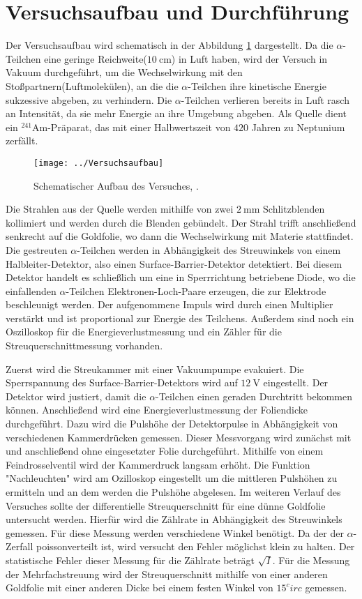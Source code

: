 \section{Versuchsaufbau und Durchführung}
\label{sec:Durchführung}
Der Versuchsaufbau wird schematisch in der Abbildung \ref{fig:versuchsaufbau} dargestellt. Da die $\alpha$-Teilchen eine geringe Reichweite($\SI{10}{\centi\meter}$) in Luft haben, wird der Versuch in Vakuum durchgeführt, um die Wechselwirkung mit den Stoßpartnern(Luftmolekülen), an die die $\alpha$-Teilchen ihre kinetische Energie sukzessive abgeben, zu verhindern. Die $\alpha$-Teilchen verlieren bereits in Luft rasch an Intensität, da sie mehr Energie an ihre Umgebung abgeben. Als Quelle dient ein $^{241}$Am-Präparat, das mit einer Halbwertszeit von $420$ Jahren zu Neptunium zerfällt.
\begin{figure}[h!]
	\centering
	\texttt{[image: ../Versuchsaufbau]}
	\caption{Schematischer Aufbau des Versuches, \cite[2]{anleitungV16}.}
	\label{fig:versuchsaufbau}
\end{figure}
Die Strahlen aus der Quelle werden mithilfe von zwei $\SI{2}{\milli\meter}$ Schlitzblenden kollimiert und werden durch die Blenden gebündelt. Der Strahl trifft anschließend senkrecht auf die Goldfolie, wo dann die Wechselwirkung mit Materie stattfindet. Die gestreuten $\alpha$-Teilchen werden in Abhängigkeit des Streuwinkels von einem Halbleiter-Detektor, also einen Surface-Barrier-Detektor detektiert. Bei diesem Detektor handelt es schließlich um eine in Sperrrichtung betriebene Diode, wo die einfallenden $\alpha$-Teilchen Elektronen-Loch-Paare erzeugen, die zur Elektrode beschleunigt werden. Der aufgenommene Impuls wird durch einen Multiplier verstärkt und ist proportional zur Energie des Teilchens. Außerdem sind noch ein Oszilloskop für die Energieverlustmessung und ein Zähler für die Streuquerschnittmessung vorhanden.

Zuerst wird die Streukammer mit einer Vakuumpumpe evakuiert. Die Sperrspannung des Surface-Barrier-Detektors wird auf $\SI{12}{\volt}$ eingestellt. Der Detektor wird justiert, damit die $\alpha$-Teilchen einen geraden Durchtritt bekommen können. Anschließend wird eine Energieverlustmessung der Foliendicke durchgeführt. Dazu wird die Pulshöhe der Detektorpulse in Abhängigkeit von verschiedenen Kammerdrücken gemessen. Dieser Messvorgang wird zunächst mit und anschließend ohne eingesetzter Folie durchgeführt. Mithilfe von einem Feindrosselventil wird der Kammerdruck langsam erhöht. Die Funktion "Nachleuchten" wird am Ozilloskop eingestellt um die mittleren Pulshöhen zu ermitteln und an dem werden die Pulshöhe abgelesen. Im weiteren Verlauf des Versuches sollte der differentielle Streuquerschnitt für eine dünne Goldfolie untersucht werden. Hierfür wird die Zählrate in Abhängigkeit des Streuwinkels gemessen. Für diese Messung werden verschiedene Winkel benötigt. Da der der $\alpha$-Zerfall poissonverteilt ist, wird versucht den Fehler möglichst klein zu halten. Der statistische Fehler dieser Messung für die Zählrate beträgt $\sqrt{I}$. Für die Messung der Mehrfachstreuung wird der Streuquerschnitt mithilfe von einer anderen Goldfolie mit einer anderen Dicke bei einem festen Winkel von $15 ^circ$ gemessen.

